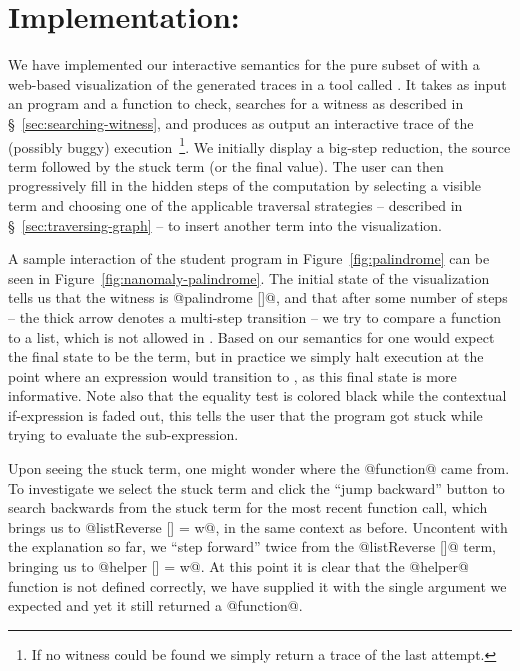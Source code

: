 \section{Implementation: \nanomaly}
\label{sec:impl-nanomaly}
We have implemented our interactive semantics for the pure subset of
\ocaml with a web-based visualization of the generated traces in a tool
called \nanomaly.
%
It takes as input an \ocaml program and a function to check, searches
for a witness as described in \S~\ref{sec:searching-witness}, and
produces as output an interactive trace of the (possibly buggy)
execution~\footnote{If no witness could be found we simply return a trace
  of the last attempt.}.
%
We initially display a big-step reduction, \ie the source term followed
by the stuck term (or the final value).
%
The user can then progressively fill in the hidden steps of the
computation by selecting a visible term and choosing one of the
applicable traversal strategies -- described in
\S~\ref{sec:traversing-graph} -- to insert another term into the
visualization.

A sample interaction of the student program in
Figure~\ref{fig:palindrome} can be seen in
Figure~\ref{fig:nanomaly-palindrome}.
%
The initial state of the visualization tells us that the witness is
@palindrome []@, and that after some number of steps -- the thick arrow
denotes a multi-step transition -- we try to compare a function to a
list, which is not allowed in \ocaml.
%
Based on our semantics for \lang one would expect the final state to be
the \stuck term, but in practice we simply halt execution at the point
where an expression would transition to \stuck, as this final state is
more informative.
%
Note also that the equality test is colored black while the contextual
if-expression is faded out, this tells the user that the program got
stuck while trying to evaluate the sub-expression.

Upon seeing the stuck term, one might wonder where the @function@
came from. 
%
To investigate we select the stuck term and click the ``jump backward''
button to search backwards from the stuck term for the most recent
function call, which brings us to @listReverse [] = w@, in the same
context as before.
%
Uncontent with the explanation so far, we ``step forward'' twice from
the @listReverse []@ term, bringing us to @helper [] = w@.
%
At this point it is clear that the @helper@ function is not defined
correctly, we have supplied it with the single argument we expected and
yet it still returned a @function@.


